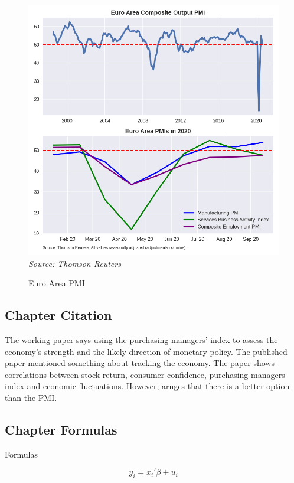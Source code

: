 \documentclass[12pt,a4paper]{article}
\begin{document}
 \begin{figure}[h!]
\caption{Euro Area PMI}
\centering
\label{figure1}
\includegraphics[width=13cm]{plots.png}
{\it Source: Thomson Reuters}
\end{figure}



\subsection{Chapter Citation}

The working paper \cite{Koenig2002} says using the purchasing managers’ index to assess the economy’s strength and the likely direction of monetary policy.
The published paper \cite{Harris1991} mentioned something about tracking the economy.
The paper \cite{Afshar2007} shows correlations between stock return, consumer confidence, purchasing managers index and economic fluctuations. 
However,\cite{Pelaez2003} aruges that there is a better option than the PMI. 


 \subsection{Chapter Formulas}
 
Formulas 

\begin{equation}
y_i = x_i'\beta + u_i
\end{equation}
\end{document}
